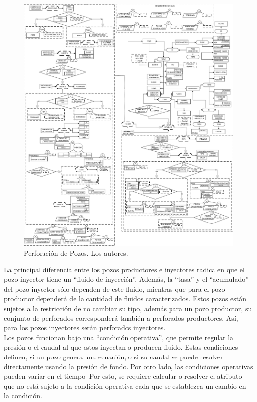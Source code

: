 \begin{figure}[h]
	\centering%
	\includegraphics[width=0.9\linewidth]{Fig/Pozo.pdf}%
	\caption[Perforación de Pozos.]{Perforación de Pozos. Los autores.} \label{fig:Well}
\end{figure}

La principal diferencia entre los pozos productores e inyectores radica en que el pozo inyector tiene un ``fluido de inyección''. Además, la ``tasa'' y el ``acumulado'' del pozo inyector sólo dependen de este fluido, mientras que para el pozo productor dependerá de la cantidad de fluidos caracterizados. Estos pozos están sujetos a la restricción de no cambiar su tipo, además para un pozo productor, su conjunto de perforados corresponderá también a perforados productores. Así, para los pozos inyectores serán perforados inyectores.\\

Los pozos funcionan bajo una ``condición operativa'', que permite regular la presión o el caudal al que estos inyectan o producen fluido. Estas condiciones definen, si un pozo genera una ecuación, o si su caudal se puede resolver directamente usando la presión de fondo. Por otro lado, las condiciones operativas pueden variar en el tiempo. Por esto, se requiere calcular o resolver el atributo que no está sujeto a la condición operativa cada que se establezca un cambio en la condición.

